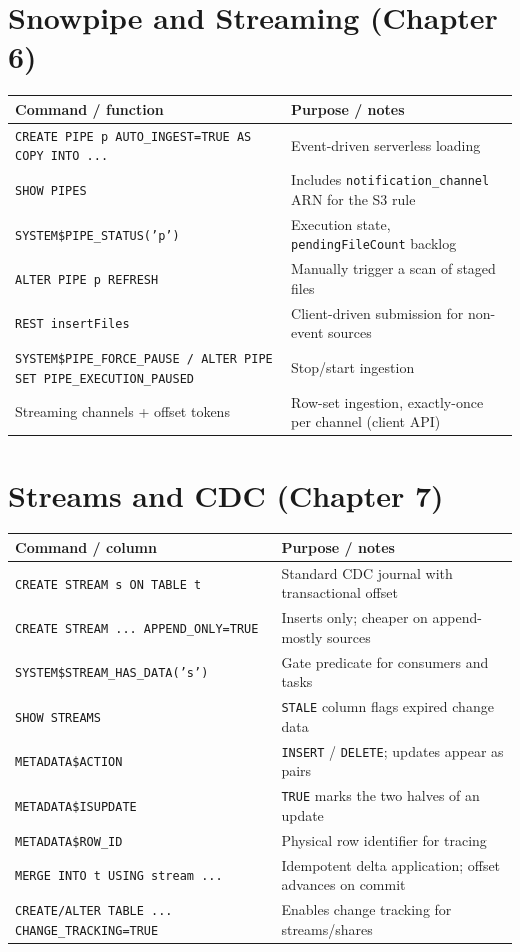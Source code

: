 \section{Snowpipe and Streaming (Chapter 6)}
\begin{center}
\footnotesize
\begin{tabular}{@{}p{5.6cm}p{8.6cm}@{}}
\toprule
\textbf{Command / function} & \textbf{Purpose / notes} \\
\midrule
\texttt{CREATE PIPE p AUTO\_INGEST=TRUE AS COPY INTO ...} & Event-driven serverless loading \\
\texttt{SHOW PIPES} & Includes \texttt{notification\_channel} ARN for the S3 rule \\
\texttt{SYSTEM\$PIPE\_STATUS('p')} & Execution state, \texttt{pendingFileCount} backlog \\
\texttt{ALTER PIPE p REFRESH} & Manually trigger a scan of staged files \\
\texttt{REST insertFiles} & Client-driven submission for non-event sources \\
\texttt{SYSTEM\$PIPE\_FORCE\_PAUSE / ALTER PIPE SET PIPE\_EXECUTION\_PAUSED} & Stop/start ingestion \\
Streaming channels + offset tokens & Row-set ingestion, exactly-once per channel (client API) \\
\bottomrule
\end{tabular}
\end{center}

\section{Streams and CDC (Chapter 7)}
\begin{center}
\footnotesize
\begin{tabular}{@{}p{5.6cm}p{8.6cm}@{}}
\toprule
\textbf{Command / column} & \textbf{Purpose / notes} \\
\midrule
\texttt{CREATE STREAM s ON TABLE t} & Standard CDC journal with transactional offset \\
\texttt{CREATE STREAM ... APPEND\_ONLY=TRUE} & Inserts only; cheaper on append-mostly sources \\
\texttt{SYSTEM\$STREAM\_HAS\_DATA('s')} & Gate predicate for consumers and tasks \\
\texttt{SHOW STREAMS} & \texttt{STALE} column flags expired change data \\
\texttt{METADATA\$ACTION} & \texttt{INSERT} / \texttt{DELETE}; updates appear as pairs \\
\texttt{METADATA\$ISUPDATE} & \texttt{TRUE} marks the two halves of an update \\
\texttt{METADATA\$ROW\_ID} & Physical row identifier for tracing \\
\texttt{MERGE INTO t USING stream ...} & Idempotent delta application; offset advances on commit \\
\texttt{CREATE/ALTER TABLE ... CHANGE\_TRACKING=TRUE} & Enables change tracking for streams/shares \\
\bottomrule
\end{tabular}
\end{center}

